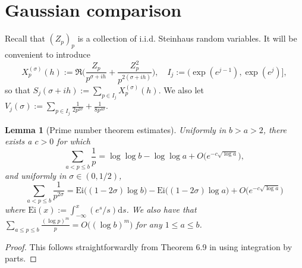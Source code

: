 \documentclass{amsart}
\newtheorem{lemma}[theorem]{Lemma}
\theoremstyle{definition}
\theoremstyle{remark}
\numberwithin{equation}{section}
\begin{document}
\section{Gaussian comparison}
Recall that $(Z_p)_p$ is a collection of {i.i.d.} Steinhaus random variables. It will be convenient to introduce
\[
    X_p^{(\sigma)}(h):=\Re\Big(\frac{Z_p}{p^{\sigma+ih}}+\frac{Z_p^2}{p^{2(\sigma+ih)}}\Big), \quad I_j:=(\exp(e^{j-1}),\exp(e^j)],
\]
so that $S_j(\sigma+ih):=\sum_{p\in I_j}X_p^{(\sigma)}(h).$ We also let $V_j(\sigma):= \sum_{p\in I_j} \frac{1}{2p^{2\sigma}}+\frac{1}{8p^{4\sigma}}.$
\begin{lemma}[Prime number theorem estimates]\label{lem:PNT}
Uniformly in $b>a>2$, there exists a $c>0$ for which
    \begin{equation}
        \sum_{a<p\leq b} \frac{1}{p}= \log\log b-\log\log a+O\big(e^{-c\sqrt{\log a}}\big),
    \end{equation}
and uniformly in $\sigma\in (0,1/2)$, 
\begin{equation}
    \sum_{a<p\leq b} \frac{1}{p^{2\sigma}} = \mathrm{Ei}\big((1-2\sigma)\log b\big)-\mathrm{Ei}\big((1-2\sigma)\log a\big)+O\big(e^{-c\sqrt{\log a}}\big)
\end{equation}
where $\mathrm{Ei}(x):=\int_{-\infty}^x(e^{s}/s)\mathrm{d}s$.
We also have that $\sum_{a\leq p\leq b}\frac{(\log p)^m}{p}=O\big((\log b)^m\big)$ for any $1\leq a\leq b$.
\end{lemma}
\begin{proof}
    This follows straightforwardly from Theorem 6.9 in \cite{MontgomeryVaughan} using integration by parts.
\end{proof}
\end{document}
